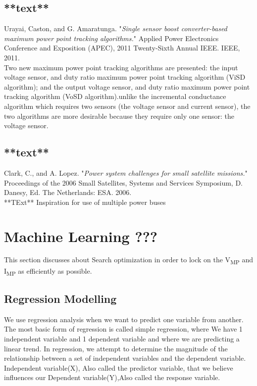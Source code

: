 {\subsection{**text**\cite{urayai2011single}}
Urayai, Caston, and G. Amaratunga. "\textit{Single sensor boost converter-based maximum power point tracking algorithms.}" Applied Power Electronics Conference and Exposition (APEC), 2011 Twenty-Sixth Annual IEEE. IEEE, 2011.\\

Two new maximum power point tracking algorithms are presented: the input voltage sensor, and duty ratio maximum power point tracking algorithm (ViSD algorithm); and the output voltage sensor, and duty ratio maximum power point tracking algorithm (VoSD algorithm).unlike the incremental conductance algorithm which requires two sensors (the voltage sensor and current sensor), the two algorithms are more desirable because they require only one sensor: the voltage sensor.  \\ 

\subsection{**text**\cite{clark2006power}}

Clark, C., and A. Lopez. "\textit{Power system challenges for small satellite missions.}" Proceedings of the 2006 Small Satellites, Systems and Services Symposium, D. Danesy, Ed. The Netherlands: ESA. 2006.\\


**TExt**
Inspiration for use of multiple power buses 



\section{Machine Learning ???}
This section discusses about Search optimization in order to lock on the  V\textsubscript{MP} and I\textsubscript{MP} as efficiently as possible.

\subsection{Regression Modelling \cite{lenarreg2006}}

We use regression analysis when we want to predict one variable from another. The most basic form of regression is called simple regression, where We have 1 independent variable and 1 dependent variable and where we are predicting a linear trend. In regression, we attempt to determine the magnitude of the relationship between a set of independent variables and the dependent variable. Independent variable(X), Also called the predictor variable, that we believe influences our Dependent variable(Y),Also called the response variable.\\

}
